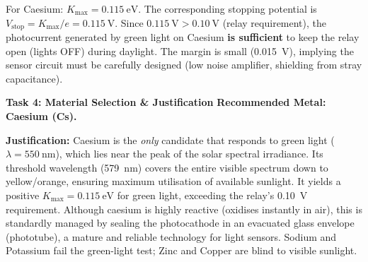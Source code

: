 \documentclass[11pt]{article}
\begin{document}
For Caesium: $K_{\text{max}} = \SI{0.115}{\electronvolt}$. The corresponding stopping potential is $V_{\text{stop}} = K_{\text{max}}/e = \SI{0.115}{\volt}$.
Since $\SI{0.115}{\volt} > \SI{0.10}{\volt}$ (relay requirement), the photocurrent generated by green light on Caesium \textbf{is sufficient} to keep the relay open (lights OFF) during daylight. The margin is small (\SI{0.015}{\volt}), implying the sensor circuit must be carefully designed (low noise amplifier, shielding from stray capacitance).

\textbf{Task 4: Material Selection \& Justification}
\textbf{Recommended Metal: Caesium (Cs).}

\textbf{Justification:} Caesium is the \emph{only} candidate that responds to green light ($\lambda = \SI{550}{\nano\meter}$), which lies near the peak of the solar spectral irradiance. Its threshold wavelength (\SI{579}{\nano\meter}) covers the entire visible spectrum down to yellow/orange, ensuring maximum utilisation of available sunlight. It yields a positive $K_{\text{max}} = \SI{0.115}{\electronvolt}$ for green light, exceeding the relay's \SI{0.10}{\volt} requirement. Although caesium is highly reactive (oxidises instantly in air), this is standardly managed by sealing the photocathode in an evacuated glass envelope (phototube), a mature and reliable technology for light sensors. Sodium and Potassium fail the green-light test; Zinc and Copper are blind to visible sunlight.
\end{document}
